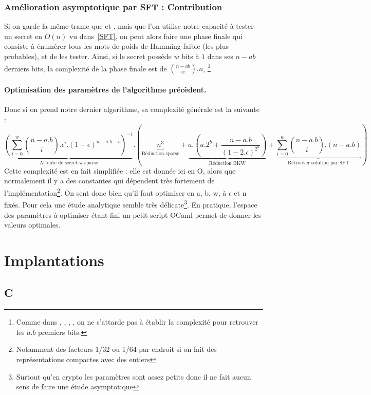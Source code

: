 \documentclass{article}		%
\theoremstyle{definition}
\theoremstyle{plain}
\theoremstyle{plain}
\theoremstyle{plain}
\theoremstyle{plain}
\theoremstyle{plain}
\begin{document}
\subsubsection{Amélioration asymptotique par SFT : Contribution}
Si on garde la même trame que \cite{Kirchner} et \cite{Bernstein}, mais que l'on utilise notre
capacité à tester un secret en $O(n)$ vu dans~\ref{SFT}, on peut alors faire une phase
finale qui consiste à énumérer tous les mots de poids de Hamming faible (les plus
probables), et de les tester. Ainsi, si le secret possède $w$ bits à $1$
dans ses $n-ab$ derniers bits,
la complexité de la phase finale est de $\binom{n-ab}{w}.n$, \footnote{Comme dans
\cite{LF}, \cite{BKW}, \cite{Kirchner}, \cite{Bernstein}, on ne s'attarde
pas à établir la complexité pour retrouver les $a.b$ premiers bits.}

\paragraph{Optimisation des paramètres de l'algorithme précèdent.}
Donc si on prend notre dernier algorithme, sa complexité générale est
la suivante :
$$\underbrace{(\sum_{i=0}^{w}\binom{n-a.b}{i}.\epsilon^i.(1-\epsilon)^{n-a.b-i})^{-1}}_{\text{Attente
de secret w sparse}}.
(\underbrace{n^3}_{\text{Réduction sparse}} +
\underbrace{a.(a.2^b+\frac{n-a.b}{(1-2.\epsilon)^{2^a}})
}_{\text{Réduction BKW}} + \underbrace{\sum_{i=0}^w \binom{n-a.b}{i}.(n-a.b)}_{\text{Retrouver solution par SFT}} )$$ 
Cette complexité est en fait simplifiée : elle est donnée ici en O, alors
que normalement il y a des constantes qui dépendent très fortement de
l'implémentation\footnote{Notamment des facteurs 1/32 ou 1/64 par
endroit si on fait des représentations compactes avec des entiers}. On sent
donc bien qu'il faut optimiser en a, b, w, à $\epsilon$ et n fixés. Pour
cela une étude analytique semble très délicate\footnote{Surtout qu'en
crypto les paramètres sont assez petits donc il ne fait aucun sens de
faire une étude asymptotique}. En pratique, l'espace des paramètres à
optimiser étant fini un petit script OCaml permet de donner les valeurs
optimales. 
\section{Implantations}
\subsection{C}
\end{document}
